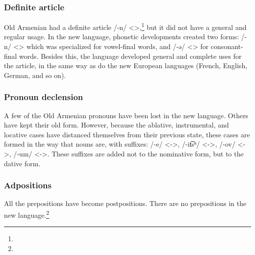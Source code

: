 \subsubsection{Definite article}

Old Armenian had a definite article /-n/ <>,\footnote{} but it did not have a general and regular usage. In the new language, phonetic developments created two forms: /-n/ <> which was specialized for vowel-final words, and /-ə/ <> for consonant-final words. Besides this, the language developed general and complete uses for the article, in the same way as do the new European languages (French, English, German, and so on). 




\begin{adjarianpage}\label{page:22}\end{adjarianpage}%

\subsubsection{Pronoun declension}
A few of the Old Armenian pronouns have been lost in the new language. Others have kept their old form. However, because the ablative, instrumental, and locative cases have distanced themselves from their previous state, these cases are formed in the way that nouns are, with suffixes: {\abl} /-e/ <->, {\abl} /-it͡sʰ/ <->, {\ins} /-ov/ <->, {\locgloss} /-um/ <->. These suffixes are added not to the nominative form, but to the dative form.

\subsubsection{Adpositions}
All the prepositions have become postpositions. There are no prepositions in the new language.\footnote{}


